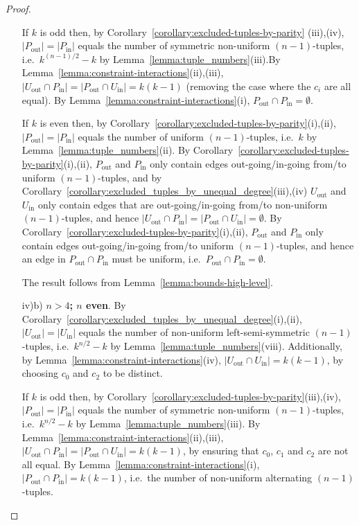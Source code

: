 \documentclass[10pt,a4paper]{amsart}
\begin{document}
\begin{proof}
\begin{itemize}
    If $k$ is odd then, by Corollary~\ref{corollary:excluded-tuples-by-parity} (iii),(iv),
    $|P_{\text{out}}|=|P_{\text{in}}|$ equals the number of symmetric non-uniform
    $(n-1)$-tuples, i.e.\ $k^{(n-1)/2}-k$ by Lemma~\ref{lemma:tuple_numbers}(iii).\newline By
    Lemma~\ref{lemma:constraint-interactions}(ii),(iii), $|U_{\text{out}}\cap
    P_{\text{in}}|=|P_{\text{out}}\cap U_{\text{in}}|=k(k-1)$ (removing the case where the
    $c_i$ are all equal).
    \newline By Lemma~\ref{lemma:constraint-interactions}(i), $P_{\text{out}}\cap
    P_{\text{in}}=\emptyset$.

    If $k$ is even then, by Corollary~\ref{corollary:excluded-tuples-by-parity}(i),(ii),
    $|P_{\text{out}}|=|P_{\text{in}}|$ equals the number of uniform $(n-1)$-tuples, i.e.\ $k$
    by Lemma~\ref{lemma:tuple_numbers}(ii).
    \newline By Corollary~\ref{corollary:excluded-tuples-by-parity}(i),(ii), $P_{\text{out}}$
    and $P_{\text{in}}$ only contain edges out-going/in-going from/to uniform $(n-1)$-tuples,
    and by Corollary~\ref{corollary:excluded_tuples_by_unequal_degree}(iii),(iv)
    $U_{\text{out}}$ and $U_{\text{in}}$ only contain edges that are out-going/in-going from/to
    non-uniform $(n-1)$-tuples, and hence $|U_{\text{out}}\cap
    P_{\text{in}}|=|P_{\text{out}}\cap U_{\text{in}}|=\emptyset$.
    \newline By Corollary~\ref{corollary:excluded-tuples-by-parity}(i),(ii), $P_{\text{out}}$
    and $P_{\text{in}}$ only contain edges out-going/in-going from/to uniform $(n-1)$-tuples,
    and hence an edge in $P_{\text{out}}\cap P_{\text{in}}$ must be uniform, i.e.\
    $P_{\text{out}}\cap P_{\text{in}}=\emptyset$.

    The result follows from Lemma~\ref{lemma:bounds-high-level}.

\item[iv)b)] {\bf $n>4$; $n$ even}. By
    Corollary~\ref{corollary:excluded_tuples_by_unequal_degree}(i),(ii),
    $|U_{\text{out}}|=|U_{\text{in}}|$ equals the number of non-uniform left-semi-symmetric
    $(n-1)$-tuples, i.e.\ $k^{n/2}-k$ by Lemma~\ref{lemma:tuple_numbers}(viii). Additionally,
    by Lemma~\ref{lemma:constraint-interactions}(iv), $|U_{\text{out}}\cap
    U_{\text{in}}|=k(k-1)$, by choosing $c_0$ and $c_2$ to be distinct.

    If $k$ is odd then, by Corollary~\ref{corollary:excluded-tuples-by-parity}(iii),(iv),
    $|P_{\text{out}}|=|P_{\text{in}}|$ equals the number of symmetric non-uniform
    $(n-1)$-tuples, i.e.\ $k^{n/2}-k$ by Lemma~\ref{lemma:tuple_numbers}(iii).
    \newline By Lemma~\ref{lemma:constraint-interactions}(ii),(iii), $|U_{\text{out}}\cap
    P_{\text{in}}|=|P_{\text{out}}\cap U_{\text{in}}|=k(k-1)$, by ensuring that $c_0$, $c_1$
    and $c_2$ are not all equal.
    \newline By Lemma~\ref{lemma:constraint-interactions}(i), $|P_{\text{out}}\cap P_{\text{in}}|=k(k-1)$,
    i.e.\ the number of non-uniform alternating $(n-1)$-tuples.


\end{itemize}
\end{proof}
\end{document}
